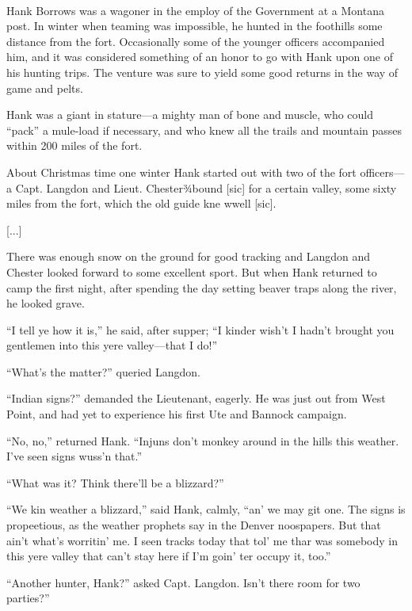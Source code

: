 \begin{ipquote}
\begin{center}
\\
\end{center}
Hank Borrows was a wagoner in the employ of the Government at a Montana post. In winter when teaming was impossible, he hunted in the foothills some distance from the fort. Occasionally some of the younger officers accompanied him, and it was considered something of an honor to go with Hank upon one of his hunting trips. The venture was sure to yield some good returns in the way of game and pelts.

Hank was a giant in stature—a mighty man of bone and muscle, who could “pack” a mule-load if necessary, and who knew all the trails and mountain passes within 200 miles of the fort.

{About Christmas time one winter Hank started out with two of the fort officers—a Capt. Langdon and Lieut. Chester¾bound [sic] for a certain valley, some sixty miles from the fort, which the old guide kne wwell [sic].

\centering
{[...]}

There was enough snow on the ground for good tracking and Langdon and Chester looked forward to some excellent sport. But when Hank returned to camp the first night, after spending the day setting beaver traps along the river, he looked grave.}

“I tell ye how it is,” he said, after supper; “I kinder wish’t I hadn’t brought you gentlemen into this yere valley—that I do!”

“What’s the matter?” queried Langdon.

“Indian signs?” demanded the Lieutenant, eagerly. He was just out from West Point, and had yet to experience his first Ute and Bannock campaign.

“No, no,” returned Hank. “Injuns don’t monkey around in the hills this weather. I’ve seen signs wuss’n that.”

“What was it? Think there’ll be a blizzard?”

“We kin weather a blizzard,” said Hank, calmly, “an’ we may git one. The signs is propeetious, as the weather prophets say in the Denver noospapers. But that ain’t what’s worritin’ me. I seen tracks today that tol’ me thar was somebody in this yere valley that can’t stay here if I’m goin’ ter occupy it, too.”

“Another hunter, Hank?” asked Capt. Langdon. Isn’t there room for two parties?”


\end{ipquote}
